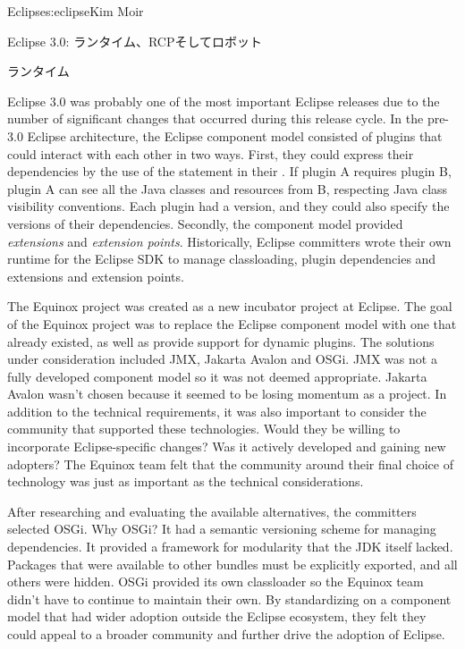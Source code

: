 \begin{aosachapter}{Eclipse}{s:eclipse}{Kim Moir}
\begin{aosasect1}{Eclipse 3.0: ランタイム、RCPそしてロボット}

\begin{aosasect2}{ランタイム}

Eclipse 3.0 was probably one of the most important Eclipse releases
due to the number of significant changes that occurred during this
release cycle.  In the pre-3.0 Eclipse architecture, the Eclipse component
model consisted of plugins that could interact with each other in two
ways.  First, they could express their dependencies by the use of
the  statement in their .  If plugin
A requires plugin B, plugin A can see all the Java classes and
resources from B, respecting Java class visibility conventions.  Each
plugin had a version, and they could also specify the versions of
their dependencies.  Secondly, the component model provided
\emph{extensions} and \emph{extension points}.  Historically, Eclipse
committers wrote their own runtime for the Eclipse SDK to manage
classloading, plugin dependencies and extensions and extension
points. 

The Equinox project was created as a new incubator project at Eclipse.
The goal of the Equinox project was to replace the Eclipse component
model with one that already existed, as well as provide
support for dynamic plugins. The solutions under consideration
included JMX, Jakarta Avalon and OSGi. JMX was not a fully developed component
model so it was not deemed appropriate. Jakarta Avalon wasn't chosen
because it seemed to be losing momentum as a project. In addition to
the technical requirements, it was also important to consider the
community that supported these technologies.  Would they be willing to
incorporate Eclipse-specific changes? Was it actively developed and
gaining new adopters?  The Equinox team felt that the community around
their final choice of technology was just as important as the
technical considerations.

After researching and evaluating the available alternatives, the
committers selected OSGi. Why OSGi?  It had a semantic versioning
scheme for managing dependencies. It provided a framework for
modularity that the JDK itself lacked. Packages that were available to
other bundles must be explicitly exported, and all others were hidden.
OSGi provided its own classloader so the Equinox team didn't have to
continue to maintain their own. By standardizing on a component model
that had wider adoption outside the Eclipse ecosystem, they felt they
could appeal to a broader community and further drive the adoption of
Eclipse.


\end{aosasect2}
\end{aosasect1}
\end{aosachapter}
